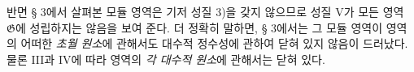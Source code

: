 
반면 § 3에서 살펴본 모듈 영역은 기저 성질 3)을 갖지 않으므로 성질 V가 모든 영역 $\mathfrak G$에 성립하지는 않음을 보여 준다. 더 정확히 말하면, § 3에서는 그 모듈 영역이 영역의 어떠한 \emph{초월 원소}에 관해서도 대수적 정수성에 관하여 닫혀 있지 않음이 드러났다. 물론 III과 IV에 따라 영역의 \emph{각 대수적 원소}에 관해서는 닫혀 있다.
